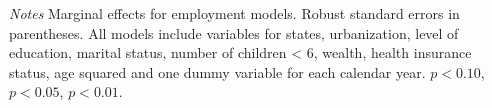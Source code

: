 \documentclass[12pt,english]{article}
\begin{document}
{{\begin{table}[!ht]
\begin{center}
\begin{adjustbox}{max width=\linewidth}
\begin{threeparttable}
{\begin{tabular}{l*{6}{S S}}
						\bottomrule
					\end{tabular}
					\begin{tablenotes}
						\item \footnotesize \textit{Notes}  Marginal effects for employment models. Robust standard errors in parentheses. All models include variables for  states, urbanization, level of education, marital status, number of children < 6, wealth, health insurance status, age squared and one dummy variable for each calendar year. \sym{*} \(p<0.10\), \sym{**} \(p<0.05\), \sym{***} \(p<0.01\).
					\end{tablenotes}
				}
			\end{threeparttable}
		\end{adjustbox}
	\end{center}
\end{table} 

\clearpage

}}
\end{document}

